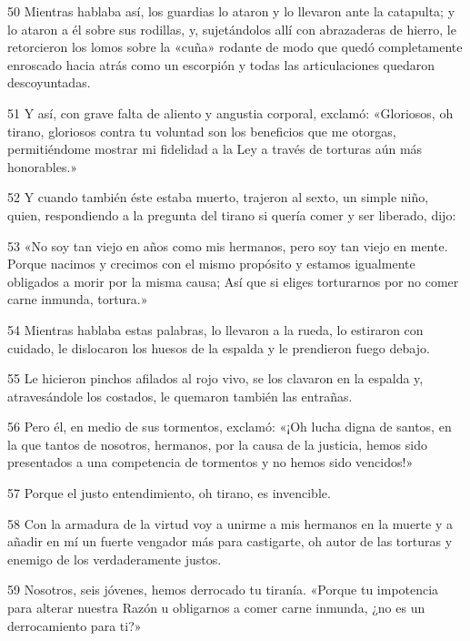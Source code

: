 \par 50 Mientras hablaba así, los guardias lo ataron y lo llevaron ante la catapulta; y lo ataron a él sobre sus rodillas, y, sujetándolos allí con abrazaderas de hierro, le retorcieron los lomos sobre la «cuña» rodante de modo que quedó completamente enroscado hacia atrás como un escorpión y todas las articulaciones quedaron descoyuntadas.

\par 51 Y así, con grave falta de aliento y angustia corporal, exclamó: «Gloriosos, oh tirano, gloriosos contra tu voluntad son los beneficios que me otorgas, permitiéndome mostrar mi fidelidad a la Ley a través de torturas aún más honorables.»

\par 52 Y cuando también éste estaba muerto, trajeron al sexto, un simple niño, quien, respondiendo a la pregunta del tirano si quería comer y ser liberado, dijo:

\par 53 «No soy tan viejo en años como mis hermanos, pero soy tan viejo en mente. Porque nacimos y crecimos con el mismo propósito y estamos igualmente obligados a morir por la misma causa; Así que si eliges torturarnos por no comer carne inmunda, tortura.»

\par 54 Mientras hablaba estas palabras, lo llevaron a la rueda, lo estiraron con cuidado, le dislocaron los huesos de la espalda y le prendieron fuego debajo.

\par 55 Le hicieron pinchos afilados al rojo vivo, se los clavaron en la espalda y, atravesándole los costados, le quemaron también las entrañas.

\par 56 Pero él, en medio de sus tormentos, exclamó: «¡Oh lucha digna de santos, en la que tantos de nosotros, hermanos, por la causa de la justicia, hemos sido presentados a una competencia de tormentos y no hemos sido vencidos!»

\par 57 Porque el justo entendimiento, oh tirano, es invencible.

\par 58 Con la armadura de la virtud voy a unirme a mis hermanos en la muerte y a añadir en mí un fuerte vengador más para castigarte, oh autor de las torturas y enemigo de los verdaderamente justos.

\par 59 Nosotros, seis jóvenes, hemos derrocado tu tiranía. «Porque tu impotencia para alterar nuestra Razón u obligarnos a comer carne inmunda, ¿no es un derrocamiento para ti?»

